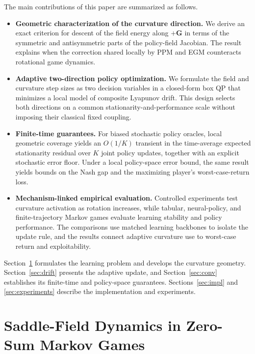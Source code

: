 \documentclass{article}
\theoremstyle{remark}
\newcommand{\bG}{\boldsymbol{G}}
\begin{document}
The main contributions of this paper are summarized as follows.
\begin{itemize}[leftmargin=*]
\item \textbf{Geometric characterization of the curvature direction.}
We derive an exact criterion for descent of the field energy along $+\bG$ in terms of the symmetric and antisymmetric parts of the policy-field Jacobian.
The result explains when the correction shared locally by PPM and EGM counteracts rotational game dynamics.
\item \textbf{Adaptive two-direction policy optimization.}
We formulate the field and curvature step sizes as two decision variables in a closed-form box QP that minimizes a local model of composite Lyapunov drift.
This design selects both directions on a common stationarity-and-performance scale without imposing their classical fixed coupling.
\item \textbf{Finite-time guarantees.}
For biased stochastic policy oracles, local geometric coverage yields an $O(1/K)$ transient in the time-average expected stationarity residual over $K$ joint policy updates, together with an explicit stochastic error floor.
Under a local policy-space error bound, the same result yields bounds on the Nash gap and the maximizing player's worst-case-return loss.
\item \textbf{Mechanism-linked empirical evaluation.}
Controlled experiments test curvature activation as rotation increases, while tabular, neural-policy, and finite-trajectory Markov games evaluate learning stability and policy performance.
The comparisons use matched learning backbones to isolate the update rule, and the results connect adaptive curvature use to worst-case return and exploitability.
\end{itemize}

Section~\ref{sec:prelim} formulates the learning problem and develops the curvature geometry.
Section~\ref{sec:drift} presents the adaptive update, and Section~\ref{sec:conv} establishes its finite-time and policy-space guarantees.
Sections~\ref{sec:impl} and \ref{sec:experiments} describe the implementation and experiments.

\section{Saddle-Field Dynamics in Zero-Sum Markov Games}\label{sec:prelim}

\end{document}
